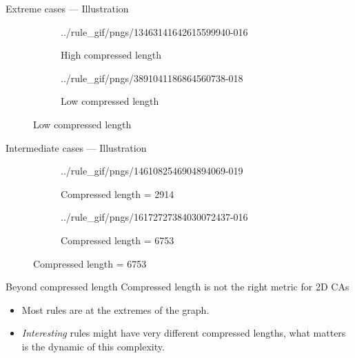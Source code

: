 \documentclass[xcolor=dvipsnames]{beamer}
\begin{document}
\begin{frame}{Extreme cases --- Illustration}

  \begin{figure}[htbp]
    \centering
    \begin{subfigure}{.49\linewidth}
      \centering
      {../rule_gif/pngs/13463141642615599940-}{0}{16}
      \caption{High compressed length}
    \end{subfigure}
    \begin{subfigure}{.49\linewidth}
      \centering
      {../rule_gif/pngs/3891041186864560738-}{0}{18}
      \caption{Low compressed length}
    \end{subfigure}
  \end{figure}

\end{frame}


\begin{frame}{Intermediate cases --- Illustration}

  \begin{figure}[htbp]
    \centering
    \begin{subfigure}{.49\linewidth}
      \centering
      {../rule_gif/pngs/1461082546904894069-}{0}{19}
      \caption{Compressed length = 2914}
    \end{subfigure}
    \begin{subfigure}{.49\linewidth}
      \centering
      {../rule_gif/pngs/16172727384030072437-}{0}{16}
      \caption{Compressed length = 6753}
    \end{subfigure}
  \end{figure}

\end{frame}


\begin{frame}{Beyond compressed length}
  Compressed length is not the right metric for 2D CAs
  \begin{itemize}
    \item Most rules are at the extremes of the graph.
    \item \emph{Interesting} rules might have very different compressed lengths,
      what matters is the \alert{dynamic} of this complexity.
  \end{itemize}

\end{frame}
\end{document}
